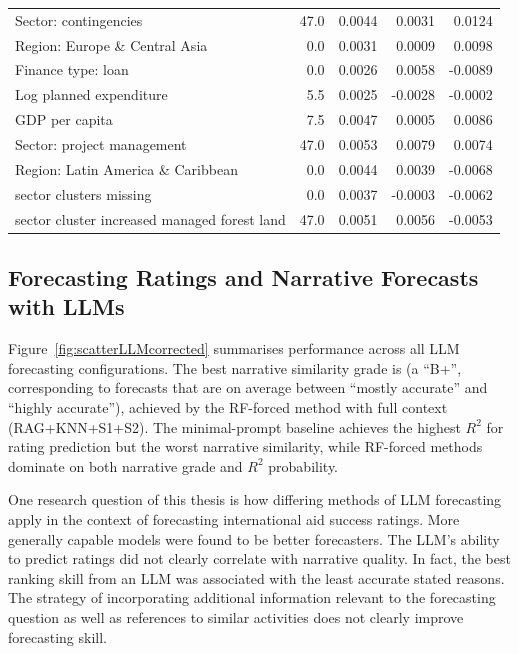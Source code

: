 \documentclass[12pt,a4paper]{article}
\begin{document}
\begin{table}[t]
\begin{tabular}{p{6cm}rrrr}
Sector: contingencies & 47.0 & 0.0044 & 0.0031 & 0.0124 \\[2pt]
Region: Europe \& Central Asia & 0.0 & 0.0031 & 0.0009 & 0.0098 \\[2pt]
Finance type: loan & 0.0 & 0.0026 & 0.0058 & -0.0089 \\[2pt]
Log planned expenditure & 5.5 & 0.0025 & -0.0028 & -0.0002 \\[2pt]
GDP per capita & 7.5 & 0.0047 & 0.0005 & 0.0086 \\[2pt]
Sector: project management & 47.0 & 0.0053 & 0.0079 & 0.0074 \\[2pt]
Region: Latin America \& Caribbean & 0.0 & 0.0044 & 0.0039 & -0.0068 \\[2pt]
sector clusters missing & 0.0 & 0.0037 & -0.0003 & -0.0062 \\[2pt]
sector cluster increased managed forest land & 47.0 & 0.0051 & 0.0056 & -0.0053 \\[2pt]
\bottomrule
\end{tabular}
\end{table}

\FloatBarrier



\subsection{Forecasting Ratings and Narrative Forecasts with LLMs} \label{sec:llm_results}

Figure~\ref{fig:scatterLLMcorrected} summarises performance across all LLM forecasting configurations. The best narrative similarity grade is \BestNarrativeGrade{} (a ``B+'', corresponding to forecasts that are on average between ``mostly accurate'' and ``highly accurate''), achieved by the RF-forced method with full context (RAG+KNN+S1+S2). The minimal-prompt baseline achieves the highest $R^2$ for rating prediction but the worst narrative similarity, while RF-forced methods dominate on both narrative grade and $R^2$ probability. 

One research question of this thesis is how differing methods of LLM forecasting apply in the context of forecasting international aid success ratings. More generally capable models were found to be better forecasters. The LLM's ability to predict ratings did not clearly correlate with narrative quality. In fact, the best ranking skill from an LLM was associated with the least accurate stated reasons. The strategy of incorporating additional information relevant to the forecasting question as well as references to similar activities does not clearly improve forecasting skill.
\end{document}
